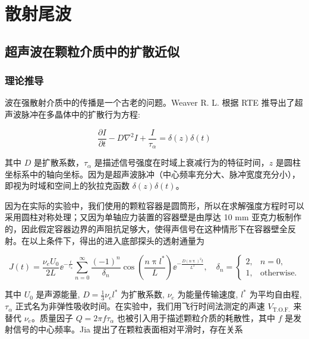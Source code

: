 
\chapter{散射尾波}

\section{超声波在颗粒介质中的扩散近似}

\subsection{理论推导}

波在强散射介质中的传播是一个古老的问题。Weaver R. L. 根据 RTE 推导出了超声波脉冲在多晶体中的扩散行为方程\cite{diffusivity}:

\begin{equation}
  \frac{\partial I}{\partial t} - D\nabla^{2}I + \frac{I}{\tau_{\alpha}} = \delta(z)\delta(t)
\end{equation}

其中 $D$ 是扩散系数，$\tau_{\alpha}$ 是描述信号强度在时域上衰减行为的特征时间，$z$ 是圆柱坐标系中的轴向坐标。因为是超声波脉冲（中心频率充分大、脉冲宽度充分小），即视为时域和空间上的狄拉克函数 $\delta{(z)}\delta(t)$。

因为在实际的实验中，我们使用的颗粒容器是圆筒形，所以在求解强度方程时可以采用圆柱对称处理；又因为单轴应力装置的容器壁是由厚达 10 \unit{\milli\meter} 亚克力板制作的，因此假定容器边界的声阻抗足够大，使得声信号在这种情形下在容器壁全反射。在以上条件下，得出的进入底部探头的透射通量\cite{PhysRevLett.93.154303}为

\begin{equation}
  J(t) = \frac{\nu_{e} U_{0}}{2L}{\ee}^{-\frac{t}{\tau_{\alpha}}}\sum_{n=0}^{\infty}\frac{(-1)^{n}}{\delta_{n}}\cos{\left(\frac{n\uppi l^{*}}{L}\right)}{\ee}^{-\frac{D(n\uppi)^{2}t}{L^{2}}},\quad \delta_{n} = \begin{cases}
    2, & n = 0, \\
    1, & \text{otherwise}.
  \end{cases}\label{eq:diffusion_approximation}
\end{equation}

其中 $U_{0}$ 是声源能量, $D = \frac{1}{3}\nu_{e}l^{*}$ 为扩散系数, $\nu_{e}$ 为能量传输速度, $l^{*}$ 为平均自由程, $\tau_{\alpha}$ 正式名为非弹性吸收时间。在实验中，我们用飞行时间法测定的声速 $V_{\text{T.O.F.}}$ 来替代 $\nu_{e}$。质量因子 $Q = 2\pi f\tau_{\alpha}$ 也被引入用于描述颗粒介质的耗散性，其中 $f$ 是发射信号的中心频率。Jia 提出了在颗粒表面相对平滑时，存在关系\cite{PhysRevLett.101.138001}

